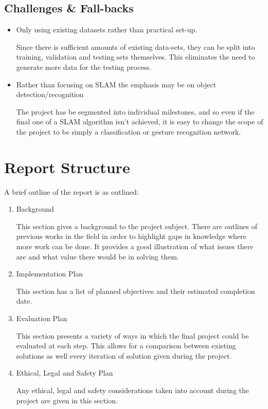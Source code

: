 \subsection{Challenges \& Fall-backs}

\begin{itemize}
    \item Only using existing datasets rather than practical set-up.

          Since there is sufficient amounts of existing data-sets, they can be split into training, validation and testing sets themselves. This eliminates the need to generate more data for the testing process.
    \item Rather than focusing on SLAM the emphasis may be on object detection/recognition

          The project has be segmented into individual milestones, and so even if the final one of a SLAM algorithm isn't achieved, it is easy to change the scope of the project to be simply a classification or gesture recognition network.
\end{itemize}

\section{Report Structure}

A brief outline of the report is as outlined:

\begin{enumerate}
    \item Background

          This section gives a background to the project subject. There are outlines of previous works in the field in order to highlight gaps in knowledge where more work can be done. It provides a good illustration of what issues there are and what value there would be in solving them.
    \item Implementation Plan

          This section has a list of planned objectives and their estimated completion date.
    \item Evaluation Plan

          This section presents a variety of ways in which the final project could be evaluated at each step. This allows for a comparison between existing solutions as well every iteration of solution given during the project.
    \item Ethical, Legal and Safety Plan

          Any ethical, legal and safety considerations taken into account during the project are given in this section.
\end{enumerate}